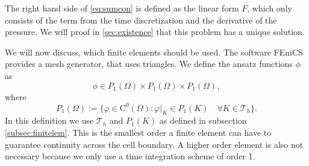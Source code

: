 \documentclass[12pt,a4paper,twoside, open=right]{scrreprt}
\theoremstyle{definition}
\theoremstyle{plain}
\begin{document}
The right hand side of \eqref{eq:sumcon} is defined as the linear form $F$, which only consists of the term from the time discretization and the derivative of the pressure. We will proof in \ref{sec:existence} that this problem has a unique solution. \par 
We will now discuss, which finite elements should be used. The software FEniCS provides a mesh generator, that uses triangles. We define the ansatz functions $\phi$ as
\begin{equation}
    \phi\in P_1(\Omega)\times P_1(\Omega)\times P_1(\Omega),
\end{equation}
where 
\begin{equation}
    P_1(\Omega):=\{\varphi\in\mathrm{C}^0(\Omega)\colon \varphi|_K\in P_1(K)\quad\forall K\in\mathcal{T}_h\}.
\end{equation}
 In this definition we use $\mathcal{T}_h$ and $P_1(K)$ as defined in subsection \ref{subsec:finitelem}. This is the smallest order a finite element can have to guarantee continuity across the cell boundary. A higher order element is also not necessary because we only use a time integration scheme of order 1. 
\end{document}
